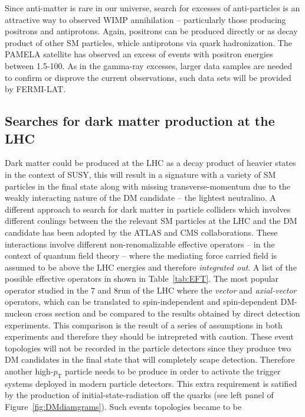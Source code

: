 Since anti-matter is rare in our universe, search for excesses of
anti-particles is an attractive way to observed WIMP annihilation --
particularly those producing positrons and antiprotons. Again,
positrons can be produced directly or as decay product of other SM
particles, whicle antiprotons via quark hadronization. The PAMELA
satellite\cite{PAMELA} has observed an excess of events with positron energies
between 1.5-100\GeV\cite{PAMELAEXCESS}. As
in the gamma-ray excesses, larger data samples are needed to confirm or
disprove the current observations, such data sets will be provided by
FERMI-LAT.

\subsection{Searches for dark matter production at the LHC}
Dark matter could be produced at the LHC as a decay product of heavier
states in the context of SUSY, this will result in a signature with a
variety of SM particles in the final state along with missing
transverse-momentum due to the weakly interacting nature of the DM
candidate -- the lightest neutralino.  A different approach to search
for dark matter in particle colliders which involves different
coulings between the the relevant SM particles at the LHC and the DM
candidate has been adopted by the ATLAS and CMS collaborations. These
interactions involve different non-renomalizable effective operators
-- in the context of quantum field theory -- where the mediating
force carried field is assumed to be above the LHC energies and
therefore \textit{integrated out}. A list of the possible effective
operators in shown in Table~\ref{tab:EFT}. The most popular
operator studied in the 7 and 8\TeV run of the LHC where the
\textit{vector} and \textit{axial-vector} operators, which can be
translated to spin-independent and spin-dependent DM-nucleon cross
section and be compared to the results obtained by direct detection
experiments. This comparison is the result of a series of assumptions
in both experiments and therefore they should be intrepreted with
caution. These event topologies will not be recorded in the particle
detectors since they produce two DM candidates in the
final state that will completely scape detection. Therefore another
high-$p_{\mathrm{T}}$ particle needs to be produce in order to
activate the trigger systems deployed in modern particle
detectors. This extra requirement is satified by the production of
initial-state-radiation off the quarks (see left panel of
Figure~\ref{fig:DMdiamgrams}). Such events topologies became to be
